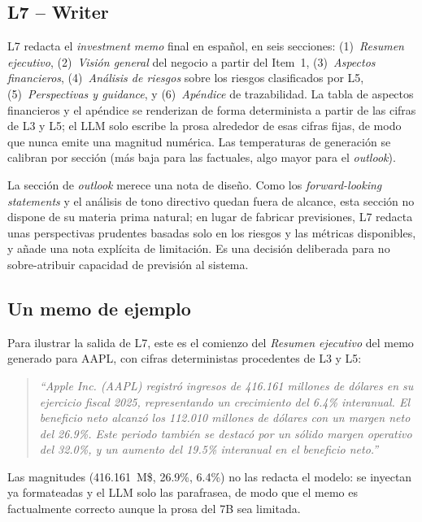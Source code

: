 \documentclass[conference]{IEEEtran}
\begin{document}
\subsection{L7 -- Writer}
L7 redacta el \textit{investment memo} final en español, en seis secciones:
(1)~\emph{Resumen ejecutivo}, (2)~\emph{Visión general} del negocio a partir del
Item~1, (3)~\emph{Aspectos financieros}, (4)~\emph{Análisis de riesgos} sobre los
riesgos clasificados por L5, (5)~\emph{Perspectivas y \textit{guidance}}, y
(6)~\emph{Apéndice} de trazabilidad. La tabla de aspectos financieros y el apéndice
se renderizan de forma determinista a partir de las cifras de L3 y L5; el LLM solo
escribe la prosa alrededor de esas cifras fijas, de modo que nunca emite una
magnitud numérica. Las temperaturas de generación se calibran por sección (más
baja para las factuales, algo mayor para el \textit{outlook}).

La sección de \textit{outlook} merece una nota de diseño. Como los
\textit{forward-looking statements} y el análisis de tono directivo quedan fuera
de alcance, esta sección no dispone de su materia prima natural; en lugar de
fabricar previsiones, L7 redacta unas perspectivas prudentes basadas solo en los
riesgos y las métricas disponibles, y añade una nota explícita de limitación. Es
una decisión deliberada para no sobre-atribuir capacidad de previsión al sistema.

\subsection{Un memo de ejemplo}
Para ilustrar la salida de L7, este es el comienzo del \textit{Resumen ejecutivo}
del memo generado para AAPL, con cifras deterministas procedentes de L3 y L5:

\begin{quote}\small\itshape
``Apple Inc. (AAPL) registró ingresos de 416.161 millones de dólares en su
ejercicio fiscal 2025, representando un crecimiento del 6.4\% interanual. El
beneficio neto alcanzó los 112.010 millones de dólares con un margen neto del
26.9\%. Este periodo también se destacó por un sólido margen operativo del
32.0\%, y un aumento del 19.5\% interanual en el beneficio neto.''
\end{quote}

\noindent Las magnitudes (416.161~M\$, 26.9\%, 6.4\%) no las redacta el modelo:
se inyectan ya formateadas y el LLM solo las parafrasea, de modo que el memo es
factualmente correcto aunque la prosa del 7B sea limitada.
\end{document}

